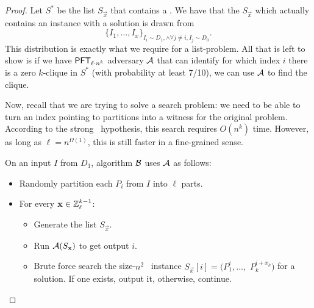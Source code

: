 \begin{proof}
	Let $S^*$ be the list $S_{\vec x}$ that contains a \zkclique. We have that the $S_{\vec{x}}$ which actually contains an instance with a solution is drawn from
	\[ \{I_1, \dots, I_x\}_{I_i \sim D_{1}, \land \forall j \neq i, I_j \sim D_{0}}.\]
	This distribution is exactly what we require for a list-problem. All that is left to show is if we have $\mathsf{PFT}_{\ell \cdot n^k}$ adversary $\mathcal{A}$ that can identify for which index $i$ there is a zero $k$-clique in $S^*$ (with probability at least 7/10), we can use $\mathcal{A}$ to find the clique.
	
	
	
	
	
	Now, recall that we are trying to solve a search problem: we need to be able to turn an index pointing to partitions into a witness for the original problem. According to the strong \zkclique~hypothesis, this search requires $O(n^k)$ time. However, as long as $\ell = n^{\Omega(1)}$, this is still faster in a fine-grained sense.
	
	On an input $I$ from $D_1$, algorithm ${\cal B}$ uses $\mathcal{A}$ as follows:
	\begin{itemize}
		\item Randomly partition each $P_i$ from $I$ into $\ell$ parts.
		\item For every $\mathbf x \in \mathbb{Z}_{\ell}^{k-1}$:
		\begin{itemize}
			\item Generate the list $S_{\vec x}$.
			\item Run $\mathcal{A}(S_{\mathbf x})$ to get output $i$.
			\item Brute force search the size-$n^2$ \zkclique~instance $S_{\vec x}[i] = (P_1^i, \ldots,$ $ P_k^{i + x_k})$ for a solution. If one exists, output it, otherwise, continue.
		\end{itemize}
	\end{itemize}
	

\end{proof}

